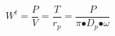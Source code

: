 \[W^t\mathrm{=}\frac{P}{V}\mathrm{=}\frac{T}{r_p}\mathrm{=}\frac{P}{\pi \mathrm{\bullet }D_p\mathrm{\bullet }\omega }\] 